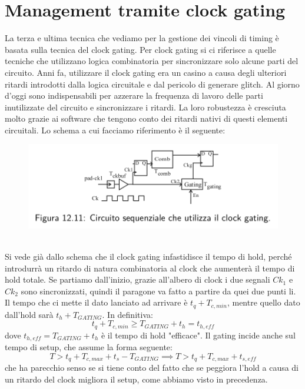 \documentclass{book}
\begin{document}
    \section*{Management tramite clock gating}
        La terza e ultima tecnica che vediamo per la gestione dei vincoli di timing è basata 
        sulla tecnica del clock gating. Per clock gating si ci riferisce a quelle tecniche che utilizzano 
        logica combinatoria per sincronizzare solo alcune parti del circuito. Anni fa, utilizzare 
        il clock gating era un casino a causa degli ulteriori ritardi introdotti dalla logica circuitale e dal pericolo
        di generare glitch. Al giorno d'oggi sono indispensabili per azzerare la frequenza di lavoro delle parti inutilizzate del circuito
        e sincronizzare i ritardi. La loro robustezza è cresciuta molto grazie ai software che tengono conto dei ritardi nativi 
        di questi elementi circuitali. Lo schema a cui facciamo riferimento è il seguente:
        \begin{figure}[h!]
            \center  
            \includegraphics[width=0.75\linewidth]{img/chapt12img10.png}
        \end{figure} \\
        Si vede già dallo schema che il clock gating infastidisce il tempo di hold, perché introdurrà un 
        ritardo di natura combinatoria al clock che aumenterà il tempo di hold totale. Se partiamo dall'inizio, 
        grazie all'albero di clock i due segnali $Ck_{1}$ e $Ck_{2}$ sono sincronizzati, quindi il paragone va fatto a 
        partire da quei due punti li. Il tempo che ci mette il dato lanciato ad arrivare è $t_{q}+T_{c,min}$, mentre quello 
        dato dall'hold sarà $t_{h}+T_{GATING}$. In definitiva:
        \begin{equation}
            t_{q}+T_{c,min} \geq T_{GATING}+t_{h} = t_{h,eff}
        \end{equation} 
        dove $t_{h,eff}=T_{GATING}+t_{h}$ è il tempo di hold "efficace". Il gating incide anche sul tempo di 
        setup, che assume la forma seguente:
        \begin{equation}
            T>t_{q}+T_{c,max}+t_{s}-T_{GATING} \implies T>t_{q}+T_{c,max}+t_{s,eff}
        \end{equation}
        che ha parecchio senso se si tiene conto del fatto che se peggiora l'hold a causa di
        un ritardo del clock migliora il setup, come abbiamo visto in precedenza.
    \newpage
\end{document}
